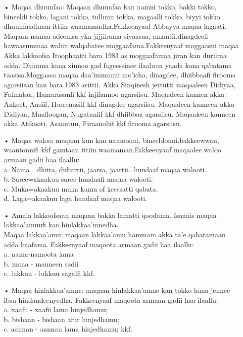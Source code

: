 \documentclass[11pt,b5paper]{book}
\begin{document}
\begin{itemize}
\item[•] Maqaa dhuunfaa: Maqaan dhuunfaa kan namni tokko, bakki tokko, bineeldi tokko, lagani tokko, tulluun tokko, magaalli tokko, biyyi tokko dhuunfaadhaan ittiin waamamudha.Fakkeenyaaf Abbayya maqaa lagaati. Maqaan namaa adeemsa ykn jijjiirama siyaasaa, amantii,dinagdeefi hawaasummaa waliin walqabatee moggaafama.Fakkeenyaaf moggaasni maqaa Akka lakkoofsa Itoophaatti bara 1983 as moggaafamaa jiran kan duriiraa adda\cite{sinqinash2018}. Dhimma kana xinnoo gad fageessinee ilaaluun yaada kana qabatama taasisa.Moggaasa maqaa daa’immanni mo’icha, dinagdee, dhiibbaafi firooma agarsiisan kan bara 1983 asittii\cite{sinqinash2018}. Akka Sinqinesh jettutti maqaaleen Didiyaa, Falmataa, Hamarasanfi kkf injifannoo agarsiisu. Maqaaleen kannen akka Ankeet, Ansiif, Horrenusiif kkf dinagdee agarsiisu. Maqaaleen kanneen akka Didiyaa, Maafloogan, Nugataniif kkf dhiibbaa agarsiisu. Maqaaleen kanneen akka Atikooti, Asaantuu, Firaanoliif kkf firooma agarsiisu.

\item[•] Maqaa waloo: maqaan kun kan namoonni, bineeldonni,bakkeewwan, waantonnifi kkf gamtaan ittiin waamaman.Fakkeenyaaf maqaalee waloo armaan gadii haa ilaallu:\\
a. Nama= dhiira, dubartii, jaarsa, jaartii...hundaaf maqaa walooti.\\
b. Saree=akaakuu saree hundaafi maqaa walooti.\\
c. Muka=akaakuu muka kamu of keessatti qabata.\\
d. Laga=akaakuu laga hundaaf maqaa walooti.

\item[•] Amala lakkoofsaan maqaan bakka lamatti qoodama. Isaanis maqaa lakkaa'amuufi kan hinlakkaa'mnedha.\\
Maqaa lakkaa’amu: maqaan lakkaa'amu hammam akka ta'e qabatamaan adda baafama. Fakkeenyaaf maqoota armaan gadii haa ilaallu:\\
a. nama-namoota lama\\
b. mana - manneen sadii\\
c. lukkuu - lukkuu sagalfi kkf.

\item[•] Maqaa hinlakkaa’amne: maqaan hinlakkaa'amne kan tokko lama jennee ibsu hindandeenyedha. Fakkeenyaaf maqoota armaan gadii haa ilaallu:\\
a. xaafii - xaafii lama hinjedhamu;\\
b. bishaan - bishaan afur hinjedhamu;\\
c. aannan - aannan lama hinjedhamu; kkf.
\end{itemize}
\end{document}
